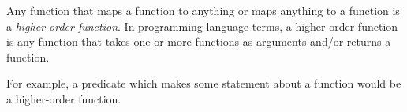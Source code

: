 \documentclass[12pt]{article}
\begin{document}
Any function that maps a function to anything or maps anything to a function is a \emph{higher-order function}.  In programming language terms, a higher-order function is any function that takes one or more functions as arguments and/or returns a function.

For example, a predicate which makes some statement about a function would be a higher-order function.
\end{document}
